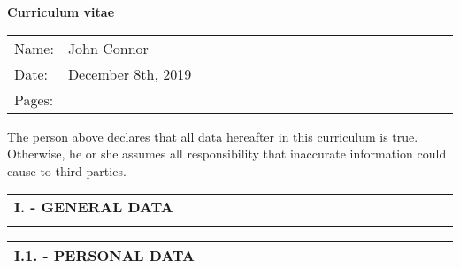 \documentclass[11pt, letterpaper]{extarticle}
\begin{document}
	\label{cv:title}
	\begin{titlepage}
		\thispagestyle{empty}
		\vspace*{0.10\textheight}
		{\textbf{\Huge Curriculum vitae}\par}
		\vspace{0.10\textheight}
		\begin{tabular}{L{0.1\linewidth}L{0.9\linewidth}N}
			{\Large       Name:} & {\Large John                 Connor              } & \\[0.70cm]
			{\Large       Date:} & {\Large December 8th, 2019                       } & \\[0.70cm]
			{\Large      Pages:} & {\Large \pageref{LastPage}                       } & \\[0.70cm]
		\end{tabular}
		\par
		\vspace*{\fill}
		The person above declares that all data hereafter in this curriculum is true. Otherwise, he or she assumes all responsibility that inaccurate information could cause to third parties.
	\end{titlepage}
	\cleardoublepage


	\label{tab:I}
	\begin{longtable}{C{1.000\linewidth}C{0.000\linewidth}N} 
		\textbf{\Large I. - GENERAL DATA} & \\[0.80cm] 
	\end{longtable}


	\label{sec:I.1.}
	\begin{longtable}{C{1.012\linewidth}N}
		\textbf{\large I.1. - PERSONAL DATA} & \\[0.70cm] \hline
	\end{longtable}
\end{document}

